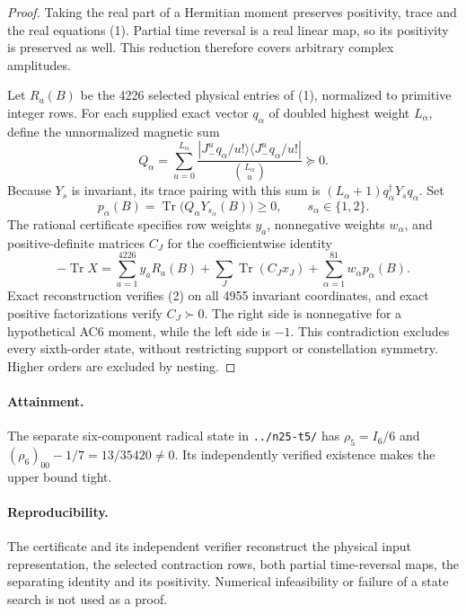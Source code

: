 \documentclass[11pt]{article}
\newcommand{\Tr}{\operatorname{Tr}}
\begin{document}
\begin{proof}
Taking the real part of a Hermitian moment preserves positivity, trace and the real equations (1). Partial time reversal is a real linear map, so its positivity is preserved as well. This reduction therefore covers arbitrary complex amplitudes.

Let $R_a(B)$ be the 4226 selected physical entries of (1), normalized to primitive integer rows. For each supplied exact vector $q_\alpha$ of doubled highest weight $L_\alpha$, define the unnormalized magnetic sum
\[
 Q_\alpha=\sum_{u=0}^{L_\alpha}
 \frac{|J_-^uq_\alpha/u!\rangle\langle J_-^uq_\alpha/u!|}{\binom{L_\alpha}{u}}\succeq0.
\]
Because $Y_s$ is invariant, its trace pairing with this sum is $(L_\alpha+1)q_\alpha^\dagger Y_s q_\alpha$. Set
\[
 p_\alpha(B)=\Tr\bigl(Q_\alpha Y_{s_\alpha}(B)\bigr)\ge0,
 \qquad s_\alpha\in\{1,2\}.
\]
The rational certificate specifies row weights $y_a$, nonnegative weights $w_\alpha$, and positive-definite matrices $C_J$ for the coefficientwise identity
\[
 \boxed{-\Tr X=\sum_{a=1}^{4226}y_aR_a(B)
 +\sum_J\Tr(C_Jx_J)+\sum_{\alpha=1}^{81}w_\alpha p_\alpha(B).}\tag{2}
\]
Exact reconstruction verifies (2) on all 4955 invariant coordinates, and exact positive factorizations verify $C_J\succ0$. The right side is nonnegative for a hypothetical AC6 moment, while the left side is $-1$. This contradiction excludes every sixth-order state, without restricting support or constellation symmetry. Higher orders are excluded by nesting.
\end{proof}
\paragraph{Attainment.}
The separate six-component radical state in \texttt{../n25-t5/} has $\rho_5=I_6/6$ and $(\rho_6)_{00}-1/7=13/35420\ne0$. Its independently verified existence makes the upper bound tight.
\paragraph{Reproducibility.}
The certificate and its independent verifier reconstruct the physical input representation, the selected contraction rows, both partial time-reversal maps, the separating identity and its positivity. Numerical infeasibility or failure of a state search is not used as a proof.
\end{document}
